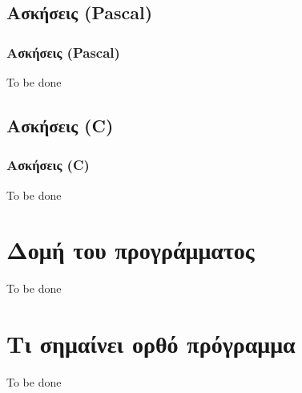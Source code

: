 \documentclass{beamer}
\begin{document}
\subsection{Ασκήσεις (Pascal)}
\begin{frame}
	\frametitle{Ασκήσεις (Pascal)}
  To be done
\end{frame}

\subsection{Ασκήσεις (C)}
\begin{frame}
	\frametitle{Ασκήσεις (C)}
  To be done
\end{frame}

\section{Δομή του προγράμματος}
\begin{frame}
  To be done
\end{frame}

\section{Τι σημαίνει ορθό πρόγραμμα}
\begin{frame}
  To be done
\end{frame}
\end{document}
